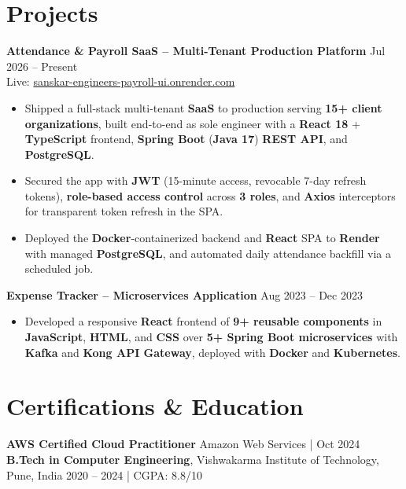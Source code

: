 \documentclass[a4paper,10pt]{article}
\begin{document}
\section*{Projects}

\textbf{Attendance \& Payroll SaaS -- Multi-Tenant Production Platform} \hfill Jul 2026 -- Present \\
Live: \href{https://sanskar-engineers-payroll-ui.onrender.com/login}{sanskar-engineers-payroll-ui.onrender.com}
\begin{itemize}[leftmargin=*]
    \item Shipped a full-stack multi-tenant \textbf{SaaS} to production serving \textbf{15+ client organizations}, built end-to-end as sole engineer with a \textbf{React 18} + \textbf{TypeScript} frontend, \textbf{Spring Boot} (\textbf{Java 17}) \textbf{REST API}, and \textbf{PostgreSQL}.
    \item Secured the app with \textbf{JWT} (15-minute access, revocable 7-day refresh tokens), \textbf{role-based access control} across \textbf{3 roles}, and \textbf{Axios} interceptors for transparent token refresh in the SPA.
    \item Deployed the \textbf{Docker}-containerized backend and \textbf{React} SPA to \textbf{Render} with managed \textbf{PostgreSQL}, and automated daily attendance backfill via a scheduled job.
\end{itemize}

\textbf{Expense Tracker -- Microservices Application} \hfill Aug 2023 -- Dec 2023
\begin{itemize}[leftmargin=*]
    \item Developed a responsive \textbf{React} frontend of \textbf{9+ reusable components} in \textbf{JavaScript}, \textbf{HTML}, and \textbf{CSS} over \textbf{5+ Spring Boot microservices} with \textbf{Kafka} and \textbf{Kong API Gateway}, deployed with \textbf{Docker} and \textbf{Kubernetes}.
\end{itemize}

\section*{Certifications \& Education}
\textbf{AWS Certified Cloud Practitioner} \hfill Amazon Web Services \;|\; Oct 2024 \\
\textbf{B.Tech in Computer Engineering}, Vishwakarma Institute of Technology, Pune, India \hfill 2020 -- 2024 \;|\; CGPA: 8.8/10
\end{document}
